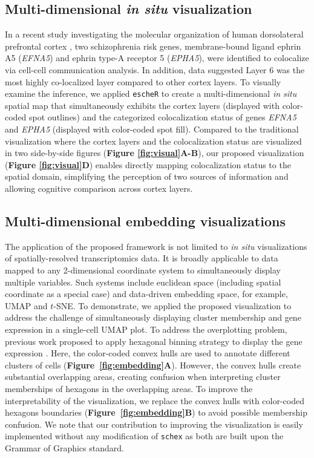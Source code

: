 \documentclass[10pt,twocolumn]{article}
\begin{document}
\subsection{Multi-dimensional \textit{in situ} visualization}
In a recent study investigating the molecular organization of human dorsolateral prefrontal cortex \cite{huukimyers_2023}, two schizophrenia risk genes, membrane-bound ligand ephrin A5 (\textit{EFNA5}) and ephrin type-A receptor 5 (\textit{EPHA5}), were identified to colocalize via cell-cell communication analysis. In addition, data suggested Layer 6 was the most highly co-localized layer compared to other cortex layers. To visually examine the inference, we applied \texttt{escheR} to create a multi-dimensional \textit{in situ} spatial map that simultaneously exhibits the cortex layers (displayed with color-coded spot outlines) and the categorized colocalization status of genes \textit{EFNA5} and \textit{EPHA5} (displayed with color-coded spot fill). Compared to the traditional visualization where the cortex layers and the colocalization status are visualized in two side-by-side figures (\textbf{Figure \ref{fig:visual}A-B}), our proposed visualization (\textbf{Figure \ref{fig:visual}D}) enables directly mapping colocalization status to the spatial domain, simplifying the perception of two sources of information and allowing cognitive comparison across cortex layers. 

\subsection{Multi-dimensional embedding visualizations}

The application of the proposed framework is not limited to \textit{in situ} visualizations of spatially-resolved transcriptomics data. It is broadly applicable to data mapped to any 2-dimensional coordinate system to simultaneously display multiple variables. Such systems include euclidean space (including spatial coordinate as a special case) and data-driven embedding space, for example, UMAP and $t$-SNE. To demonstrate, we applied the proposed visualization to address the challenge of simultaneously displaying cluster membership and gene expression in a single-cell UMAP plot. To address the overplotting problem, previous work proposed to apply hexagonal binning strategy to display the gene expression \cite{freytag_2020}. Here, the color-coded convex hulls are used to annotate different clusters of cells (\textbf{Figure~\ref{fig:embedding}A}). However, the convex hulls create substantial overlapping areas, creating confusion when interpreting cluster memberships of hexagons in the overlapping areas. To improve the interpretability of the visualization, we replace the convex hulls with color-coded hexagons boundaries (\textbf{Figure~\ref{fig:embedding}B}) to avoid possible membership confusion. We note that our contribution to improving the visualization is easily implemented without any modification of \texttt{schex} as both are built upon the Grammar of Graphics \cite{wilkinson_2012} standard.
\end{document}
